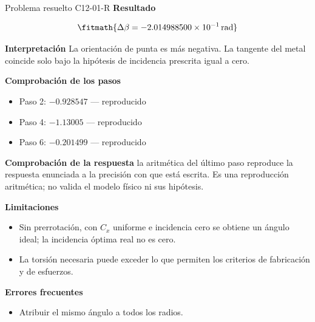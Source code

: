 \documentclass[10pt,openany]{book}
\begin{document}
\begin{studiumworked}{Problema resuelto C12-01-R}
\noindent\textbf{Resultado}

\[
\fitmath{\Delta\beta=-2.014988500\times10^{-1}\,\mathrm{rad}}
\]

\noindent\textbf{Interpretación}
La orientación de punta es más negativa. La tangente del metal coincide solo bajo la hipótesis de incidencia prescrita igual a cero.

\noindent\textbf{Comprobación de los pasos}
\begin{itemize}
\item Paso 2: $-0.928547$ — reproducido
\item Paso 4: $-1.13005$ — reproducido
\item Paso 6: $-0.201499$ — reproducido
\end{itemize}

\noindent\textbf{Comprobación de la respuesta} la aritmética del último paso reproduce la respuesta enunciada a la precisión con que está escrita. Es una reproducción aritmética; no valida el modelo físico ni sus hipótesis.

\noindent\textbf{Limitaciones}
\begin{itemize}
\item Sin prerrotación, con $C_x$ uniforme e incidencia cero se obtiene un ángulo ideal; la incidencia óptima real no es cero.
\item La torsión necesaria puede exceder lo que permiten los criterios de fabricación y de esfuerzos.
\end{itemize}

\noindent\textbf{Errores frecuentes}
\begin{itemize}
\item Atribuir el mismo ángulo a todos los radios.
\end{itemize}
\end{studiumworked}
\end{document}
